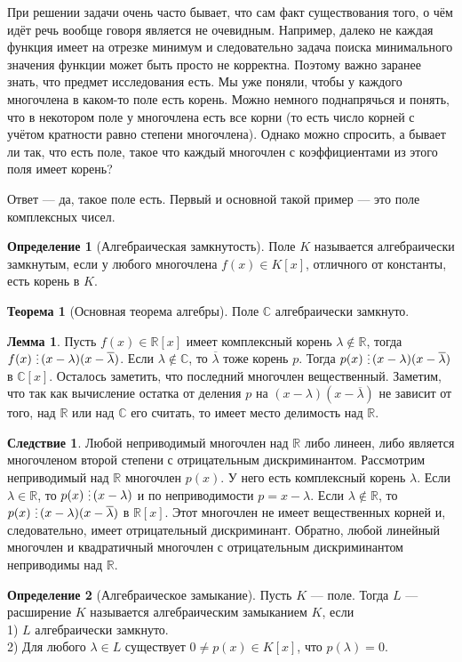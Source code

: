 \documentclass[10pt,a4paper,oneside]{book}
\theoremstyle{definition}
\newtheorem*{defn}{Определение}
\newtheorem{thm}{Теорема}
\newtheorem{lem}{Лемма}
\newtheorem{cor}{Следствие}
\newcommand{\mb}[1]{\mathbb{#1}}
\newcommand{\ovl}{\overline}
\newcommand{\di}{\mathop{\,\scalebox{0.85}{\raisebox{-1.2pt}[0.5\height]{\vdots}}\,}}
\def\thrm{\begin{thm}}
\def\ethrm{\end{thm}}
\def\dfn{\begin{defn}}
\def\edfn{\end{defn}}
\def\lm{\begin{lem}}
\def\elm{\end{lem}}
\def\crl{\begin{cor}}
\def\ecrl{\end{cor}}
\begin{document}
При решении задачи очень часто бывает, что сам факт существования того, о чём идёт речь вообще говоря является не очевидным. Например, далеко не каждая функция имеет на отрезке минимум и следовательно задача поиска минимального значения функции может быть просто не корректна. Поэтому важно заранее знать, что предмет исследования есть. Мы уже поняли, чтобы у каждого многочлена в каком-то поле есть корень. Можно немного поднапрячься и понять, что в некотором поле у многочлена есть все корни (то есть число корней с учётом кратности равно степени многочлена). Однако можно спросить, а бывает ли так, что есть поле, такое что каждый многочлен с коэффициентами из этого поля имеет корень?

Ответ — да, такое поле есть. Первый и основной такой пример --- это поле комплексных чисел.
\dfn[Алгебраическая замкнутость] Поле $K$ называется алгебраически замкнутым, если у любого многочлена  $f(x)\in K[x]$, отличного от константы, есть корень в $K$.
\edfn

\thrm[Основная теорема алгебры] Поле $\mb C$ алгебраически замкнуто.
\ethrm

\lm Пусть $f(x)\in \mb R[x]$ имеет комплексный корень $\lambda \notin \mb R$, тогда $f(x)\di(x-\lambda)(x-\ovl{\lambda})$.
\proof Если $\lambda \notin \mb C$, то $\ovl{\lambda}$ тоже корень $p$. Тогда $p(x)\di(x-\lambda)(x-\ovl{\lambda})$ в $\mb C[x]$. Осталось заметить, что последний многочлен вещественный. Заметим, что так как вычисление остатка от деления $p$ на $(x-\lambda)(x-\ovl{\lambda})$ не зависит от того, над $\mb R$ или над $\mb C$ его считать, то имеет место делимость над $\mb R$.
\endproof
\elm

\crl Любой неприводимый многочлен над $\mb R$ либо линеен, либо является многочленом второй степени с отрицательным дискриминантом.
\proof Рассмотрим неприводимый над $\mb R$ многочлен $p(x)$. У него есть комплексный корень $\lambda$. Если $\lambda \in \mb R$, то $p(x)\di (x-\lambda)$ и по неприводимости $p=x-\lambda$.  Если $\lambda \notin \mb R$, то $p(x)\di (x-\lambda)(x-\ovl{\lambda})$ в $\mb R[x]$. Этот многочлен не имеет вещественных корней и, следовательно, имеет отрицательный дискриминант. Обратно, любой линейный многочлен и квадратичный многочлен с отрицательным дискриминантом неприводимы над $\mb R$.
\endproof
\ecrl

\dfn[Алгебраическое замыкание] Пусть $K$ --- поле. Тогда $L$ --- расширение $K$ называется алгебраическим замыканием $K$, если \\
1) $L$ алгебраически замкнуто.\\
2) Для любого $ \lambda \in L$ существует $0\neq p(x)\in K[x]$, что $p(\lambda)=0$.
\edfn
\end{document}
